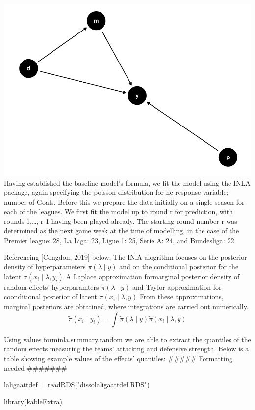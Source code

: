 \documentclass[
]{article}
\newenvironment{Shaded}{\begin{snugshade}}{\end{snugshade}}
\newcommand{\FunctionTok}[1]{\textcolor[rgb]{0.00,0.00,0.00}{#1}}
\newcommand{\NormalTok}[1]{#1}
\newcommand{\OtherTok}[1]{\textcolor[rgb]{0.56,0.35,0.01}{#1}}
\newcommand{\StringTok}[1]{\textcolor[rgb]{0.31,0.60,0.02}{#1}}
\begin{document}
\includegraphics{Dissertation-Write-Up-V1_files/figure-latex/DAG-1.pdf}
Having established the baseline model's formula, we fit the model using
the INLA package, again specifying the poisson distribution for he
response variable; number of Goals. Before this we prepare the data
initially on a single season for each of the leagues. We first fit the
model up to round r for prediction, with rounds 1,\ldots, r-1 having
been played already. The starting round number r was determined as the
next game week at the time of modelling, in the case of the Premier
league: 28, La Liga: 23, Ligue 1: 25, Serie A: 24, and Bundesliga: 22.

Referencing {[}Congdon, 2019{]} below; The INlA alogrithm focuses on the
posterior density of hyperparameters \(\pi( \lambda \mid y)\) and on the
conditional posterior for the latent \(\pi(x_i \mid \lambda , y_i)\) A
Laplace approximation formarginal posterior density of random effects'
hyperparamters \(\tilde{\pi}(\lambda \mid y)\) and Taylor approximation
for coonditional posterior of latent
\(\tilde{\pi}(x_i \mid \lambda , y)\) From these approximations,
marginal posteriors are obtatined, where integrations are carried out
numerically.
\[\tilde{\pi}(x_i \mid y_i) = \int \tilde{\pi}(\lambda \mid y)  \tilde{\pi}(x_i \mid \lambda , y)\]

Using values forminla.summary.random we are able to extract the
quantiles of the random effects measuring the teams' attacking and
defensive strength. Below is a table showing example values of the
effects' quantiles: \#\#\#\#\# Formatting needed \#\#\#\#\#\#\#

\begin{Shaded}
\begin{Highlighting}[]
\NormalTok{laligaattdef }\OtherTok{=} \FunctionTok{readRDS}\NormalTok{(}\StringTok{"dissolaligaattdef.RDS"}\NormalTok{)}

\FunctionTok{library}\NormalTok{(kableExtra)}
\end{Highlighting}
\end{Shaded}
\end{document}

